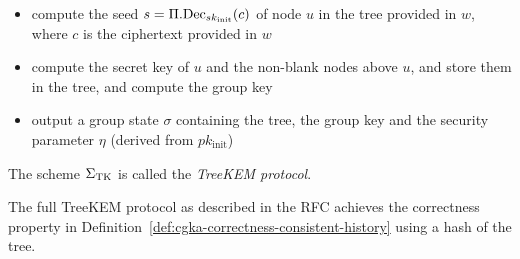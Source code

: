 \begin{definition}
\begin{itemize}
\begin{itemize}
			      \item compute the seed $s = \Pi.\mathrm{Dec}_{sk_{\mathrm{init}}}(c)$ of node $u$ in the tree provided in $w$, where $c$ is the ciphertext provided in $w$
			      \item compute the secret key of $u$ and the non-blank nodes above $u$, and store them in the tree, and compute the group key
			      \item output a group state $\sigma$ containing the tree, the group key and the security parameter $\eta$ (derived from $pk_{\mathrm{init}}$)
		      \end{itemize}
	\end{itemize}
	The scheme $\Sigma_{\mathrm{TK}}$ is called the \emph{TreeKEM protocol}.
\end{definition}

The full TreeKEM protocol as described in the RFC achieves the correctness property in Definition~\ref{def:cgka-correctness-consistent-history} using a hash of the tree.
